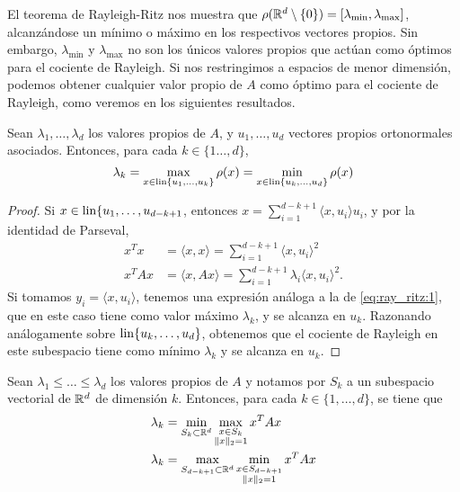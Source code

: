 El teorema de Rayleigh-Ritz nos muestra que $\rho(\mathbb{R}^d \setminus \{0\}) = [\lambda_{\min}, \lambda_{\max}]$, alcanzándose un mínimo o máximo en los respectivos vectores propios. Sin embargo, $\lambda_{\min}$ y $\lambda_{\max}$ no son los únicos valores propios que actúan como óptimos para el cociente de Rayleigh. Si nos restringimos a espacios de menor dimensión, podemos obtener cualquier valor propio de $A$ como óptimo para el cociente de Rayleigh, como veremos en los siguientes resultados.

\begin{lem} \label{lem:courant_fischer}
    Sean $\lambda_1,\dots,\lambda_d$ los valores propios de $A$, y $u_1,\dots,u_d$ vectores propios ortonormales asociados. Entonces, para cada $k \in \{1\dots,d\}$,
    \begin{equation}
        \lambda_k = \max_{x \in \operatorname{lin}\{u_1,\dots,u_k\}} \rho(x) = \min_{x \in \operatorname{lin}\{u_k,\dots,u_{d}\}} \rho(x)
    \end{equation}
\end{lem}

\begin{proof}
    Si $x \in \operatorname{lin}\{u_1,\dots,u_{d-k+1}$, entonces $x = \sum_{i=1}^{d-k+1} \langle x, u_i \rangle u_i$, y por la identidad de Parseval,
    \begin{align*}
        x^Tx &= \langle x, x \rangle = \sum_{i=1}^{d-k+1} \langle x, u_i \rangle^2 \\
        x^TAx &= \langle x, Ax \rangle = \sum_{i=1}^{d-k+1} \lambda_i \langle x, u_i \rangle^2.
    \end{align*}
    Si tomamos $y_i = \langle x, u_i \rangle$, tenemos una expresión análoga a la de \ref{eq:ray_ritz:1}, que en este caso tiene como valor máximo $\lambda_k$, y se alcanza en $u_k$. Razonando análogamente sobre $\operatorname{lin}\{u_k,\dots,u_{d}\}$, obtenemos que el cociente de Rayleigh en este subespacio tiene como mínimo $\lambda_k$ y se alcanza en $u_k$.
\end{proof}

\begin{thm} \label{thm:courant_fischer}
    Sean $\lambda_1 \le \dots \le \lambda_d$ los valores propios de $A$ y notamos por $S_k$ a un subespacio vectorial de $\mathbb{R}^d$ de dimensión $k$. Entonces, para cada $k \in \{1,\dots,d\}$, se tiene que
    \begin{align}
        \lambda_k &= \min_{S_{k} \subset \mathbb{R}^d} \max_{\substack{x \in S_{k} \\ \|x\|_2 = 1}} x^TAx \label{eq:courant_fischer:1}\\ 
        \lambda_k &= \max_{S_{d-k+1} \subset \mathbb{R}^d} \min_{\substack{x \in S_{d-k+1} \\ \|x\|_2 = 1}} x^TAx \label{eq:courant_fischer:2}
    \end{align}
\end{thm}

